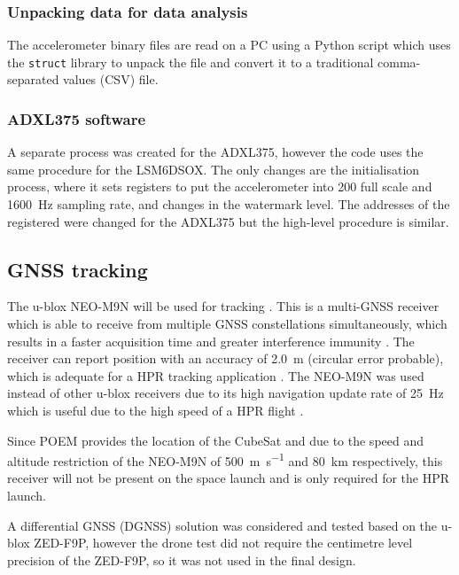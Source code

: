 \documentclass[]{report}
\begin{document}
\subsubsection{Unpacking data for data analysis}

The accelerometer binary files are read on a PC using a Python script which uses the \texttt{struct} library to unpack the file and convert it to a traditional comma-separated values (CSV) file.

\subsubsection{ADXL375 software}

A separate process was created for the ADXL375, however the code uses the same procedure for the LSM6DSOX. The only changes are the initialisation process, where it sets registers to put the accelerometer into \SI{200}{\gacc} full scale and \SI{1600}{\hertz} sampling rate, and changes in the watermark level. The addresses of the registered were changed for the ADXL375 but the high-level procedure is similar.

\subsection{GNSS tracking}

The u-blox NEO-M9N will be used for tracking \cite{ublox2023neo_m9n_datasheet}. This is a multi-GNSS receiver which is able to receive from multiple GNSS constellations simultaneously, which results in a faster acquisition time and greater interference immunity \cite{ublox2023neo_m9n_datasheet}. The receiver can report position with an accuracy of \SI{2.0}{\metre} (circular error probable), which is adequate for a HPR tracking application \cite{ublox2023neo_m9n_datasheet}. The NEO-M9N was used instead of other u-blox receivers due to its high navigation update rate of \SI{25}{\hertz} which is useful due to the high speed of a HPR flight \cite{ublox2023neo_m9n_datasheet}.

Since POEM provides the location of the CubeSat and due to the speed and altitude restriction of the NEO-M9N of \SI{500}{\metre\per\second} and \SI{80}{\kilo\metre} respectively, this receiver will not be present on the space launch and is only required for the HPR launch.

A differential GNSS (DGNSS) solution was considered and tested based on the u-blox ZED-F9P, however the drone test did not require the centimetre level precision of the ZED-F9P, so it was not used in the final design.
\end{document}

